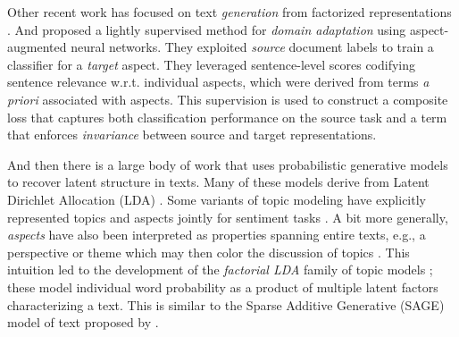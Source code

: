 \documentclass[11pt,a4paper]{article}
\begin{document}

Other recent work has focused on text \emph{generation} from factorized representations \cite{larsson2017disentangled}. And  proposed a lightly supervised method for \emph{domain adaptation} using aspect-augmented neural networks. They exploited \emph{source} document labels to train a classifier for a \emph{target} aspect. They leveraged sentence-level scores codifying sentence relevance w.r.t. individual aspects, which were derived from terms \emph{a priori} associated with aspects. This supervision is used to construct a composite loss that captures both classification performance on the source task and a term that enforces \emph{invariance} between source and target representations.



And then there is a large body of work that uses probabilistic generative models to recover latent structure in texts. Many of these models derive from Latent Dirichlet Allocation (LDA) \cite{blei2003latent}. Some variants of topic modeling have explicitly represented topics and aspects jointly for sentiment tasks \cite{brody2010unsupervised,sauper2010incorporating,sauper2011content,mukherjee2012aspect,sauper2013automatic,kim2013hierarchical}. A bit more generally, \emph{aspects} have also been interpreted as properties spanning entire texts, e.g., a perspective or theme which may then color the discussion of topics \cite{paul2010two}. This intuition led to the development of the \emph{factorial LDA} family of topic models \cite{paul2012factorial,wallace2014large}; these model individual word probability as a product of multiple latent factors characterizing a text. This is similar to the Sparse Additive Generative (SAGE) model of text proposed by .%
\end{document}
